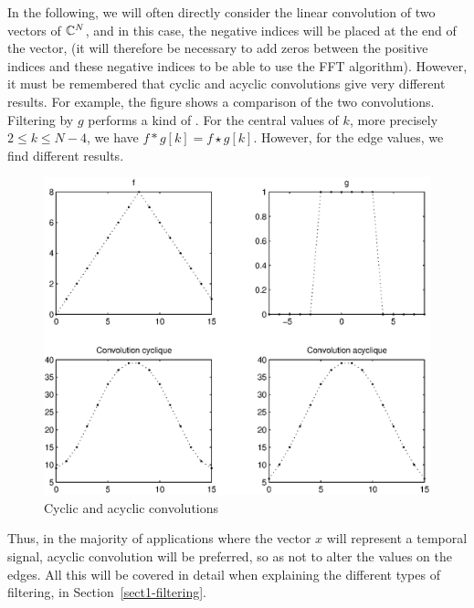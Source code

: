  
In the following, we will often directly consider the linear convolution of two vectors of $ \mathbb{C}^N $, and in this case, the negative indices will be placed at the end of the vector, (it will therefore be necessary to add zeros between the positive indices and these negative indices to be able to use the FFT algorithm). However, it must be remembered that cyclic and acyclic convolutions give very different results. For example, the figure  shows a comparison of the two convolutions. Filtering by $ g $ performs a kind of . For the central values of $ k $, more precisely $ 2 \leq k \leq N-4 $, we have $ f * g [k] = f \star g [k] $. However, for the edge values, we find different results. \begin{figure}[ht]
    \begin{center}
    \includegraphics [scale = 0.6]{images/diff-conv-lineaire-circulaire.eps}
    \end{center}
    \caption{Cyclic and acyclic convolutions}
              \label{fig-diff-conv-linear-circular}
\end{figure}
Thus, in the majority of applications where the vector $ x $ will represent a temporal signal, acyclic convolution will be preferred, so as not to alter the values on the edges. All this will be covered in detail when explaining the different types of filtering, in Section~\ref{sect1-filtering}.

